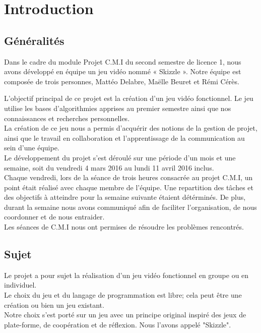 \chapter{Introduction}

\section {Généralités}

Dans le cadre du module Projet C.M.I du second semestre de licence 1,
nous avons développé en équipe un jeu vidéo nommé « Skizzle ».
Notre équipe est composée de trois personnes, Mattéo Delabre, Maëlle Beuret
et Rémi Cérès.

L'objectif principal de ce projet est la création d'un jeu vidéo fonctionnel. Le jeu utilise les bases d'algorithmies apprises au premier semestre ainsi que nos connaissances et
recherches personnelles.\\
La création de ce jeu nous a permis d'acquérir des notions de la gestion de projet, ainsi que le travail en collaboration et l'apprentissage de la
communication au sein d'une équipe.
\\

Le développement du projet s'est déroulé sur une période d'un mois et une semaine,
soit du vendredi 4 mars 2016 au lundi 11 avril 2016 inclus.\\
Chaque vendredi,
lors de la séance de trois heures consacrée au projet C.M.I, un point était réalisé avec chaque membre de l'équipe.
Une repartition des tâches et des objectifs
à atteindre pour la semaine suivante étaient détérminés. De plus, durant la semaine nous avons communiqué afin de faciliter l'organisation, de nous coordonner et de nous entraider.\\

Les séances de C.M.I nous ont permises de résoudre les problèmes rencontrés.

\section {Sujet}
Le projet a pour sujet la réalisation d'un jeu vidéo
fonctionnel en groupe ou en individuel.\\
Le choix du jeu et du langage de programmation est libre; cela peut être une création ou bien un jeu existant.\\

Notre choix s'est porté sur un jeu avec un principe original inspiré des jeux de
plate-forme, de coopération et de réflexion. Nous l'avons appelé "Skizzle".\\

